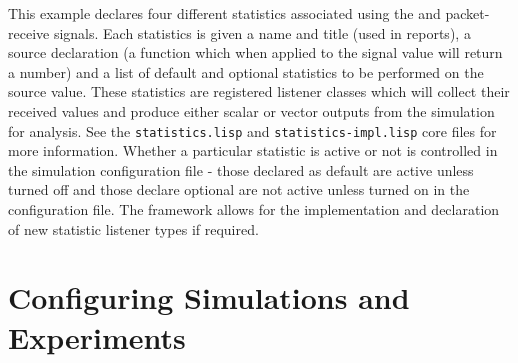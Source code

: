 \documentclass[a4paper,11pt,twoside,openany]{report}
\newcommand{\file}[1]{{\tt #1}}
\begin{document}
This example declares four different statistics associated using the
 and {packet-receive} signals. Each statistics is
given a name and title (used in reports), a source declaration (a
function which when applied to the signal value will return a number)
and a list of default and optional statistics to be performed on the
source value. These statistics are registered listener classes which 
will collect their received values and produce either scalar or
vector outputs from the simulation for analysis. See the
\file{statistics.lisp} and \file{statistics-impl.lisp} core files for
more information. Whether a particular statistic is active or not is
controlled in the simulation configuration file - those declared as
default are active unless turned off and those declare optional are
not active unless turned on in the configuration file. The
framework allows for the implementation and declaration of new
statistic listener types if required. 

\chapter{Configuring Simulations and Experiments}

\appendix




\printindex

\printglossaries
\end{document}
